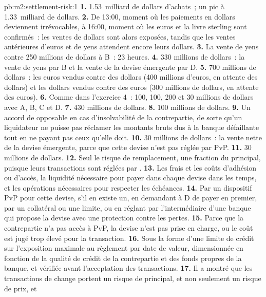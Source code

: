 \begin{solution}{pb:m2:settlement-risk:1}
\textbf{1.} 1.53~milliard de dollars d'achats~; un pic à 1.33~milliard de dollars.
\textbf{2.} De 13:00, moment où les paiements en dollars deviennent irrévocables, à 16:00, moment où
les euros et la livre sterling sont confirmés~: les ventes de dollars sont alors exposées, tandis que les
ventes antérieures d'euros et de yens attendent encore leurs dollars.
\textbf{3.} La vente de yens contre 250 millions de dollars à B~: 23 heures.
\textbf{4.} 330 millions de dollars~: la vente de yens par B et la vente de la devise émergente par D.
\textbf{5.} 700 millions de dollars~: les euros vendus contre des dollars (400 millions d'euros,
en attente des dollars) et les dollars vendus contre des euros (300 millions de dollars, en attente des euros).
\textbf{6.} Comme dans l'exercice 4~: 100, 100, 200 et 30 millions de dollars avec A, B, C et D.
\textbf{7.} 430 millions de dollars.
\textbf{8.} 100 millions de dollars.
\textbf{9.} Un accord de  opposable en cas d'insolvabilité de la contrepartie, de sorte
qu'un liquidateur ne puisse pas réclamer les montants bruts dus à la banque défaillante tout en ne
payant pas ceux qu'elle doit.
\textbf{10.} 30 millions de dollars~: la vente nette de la devise émergente, parce que cette
devise n'est pas réglée par PvP.
\textbf{11.} 30 millions de dollars.
\textbf{12.} Seul le risque de remplacement, une fraction du principal, puisque leurs transactions
sont réglées par .
\textbf{13.} Les frais et les coûts d'adhésion ou d'accès, la liquidité nécessaire pour payer dans chaque
devise dans les temps, et les opérations nécessaires pour respecter les échéances.
\textbf{14.} Par un dispositif PvP pour cette devise, s'il en existe un, en demandant à D de payer
en premier, par un collatéral ou une limite, ou en réglant par l'intermédiaire d'une banque qui propose la
devise avec une protection contre les pertes.
\textbf{15.} Parce que la contrepartie n'a pas accès à PvP, la devise n'est pas
prise en charge, ou le coût est jugé trop élevé pour la transaction.
\textbf{16.} Sous la forme d'une limite de crédit sur l'exposition maximale au règlement par date de valeur,
dimensionnée en fonction de la qualité de crédit de la contrepartie et des fonds propres de la banque, et vérifiée
avant l'acceptation des transactions.
\textbf{17.} Il a montré que les transactions de change portent un risque de principal, et non seulement un risque de prix, et

\end{solution}
